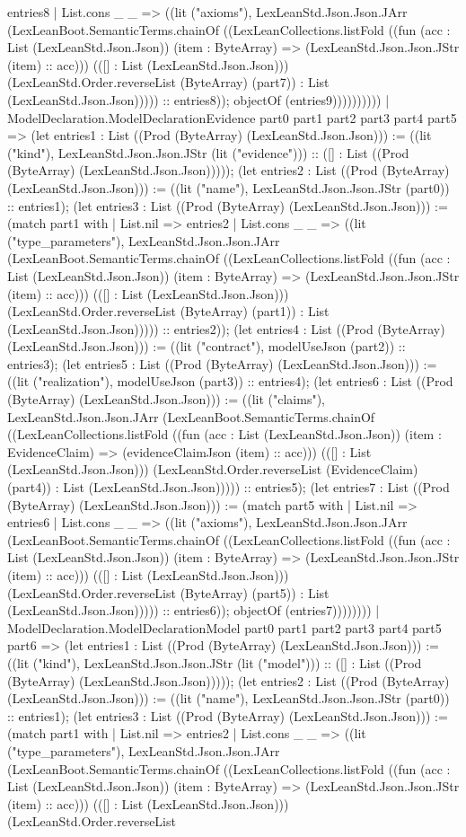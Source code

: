 \documentclass[11pt]{article}
\begin{document}
entries8 | List.cons \_ \_ => ((lit ("axioms"), LexLeanStd.Json.Json.JArr (LexLeanBoot.SemanticTerms.chainOf ((LexLeanCollections.listFold ((fun (acc : List (LexLeanStd.Json.Json)) (item : ByteArray) => (LexLeanStd.Json.Json.JStr (item) :: acc))) (([] : List (LexLeanStd.Json.Json))) (LexLeanStd.Order.reverseList (ByteArray) (part7)) : List (LexLeanStd.Json.Json))))) :: entries8)); objectOf (entries9)))))))))) | ModelDeclaration.ModelDeclarationEvidence part0 part1 part2 part3 part4 part5 => (let entries1 : List ((Prod (ByteArray) (LexLeanStd.Json.Json))) := ((lit ("kind"), LexLeanStd.Json.Json.JStr (lit ("evidence"))) :: ([] : List ((Prod (ByteArray) (LexLeanStd.Json.Json))))); (let entries2 : List ((Prod (ByteArray) (LexLeanStd.Json.Json))) := ((lit ("name"), LexLeanStd.Json.Json.JStr (part0)) :: entries1); (let entries3 : List ((Prod (ByteArray) (LexLeanStd.Json.Json))) := (match part1 with | List.nil => entries2 | List.cons \_ \_ => ((lit ("type\_parameters"), LexLeanStd.Json.Json.JArr (LexLeanBoot.SemanticTerms.chainOf ((LexLeanCollections.listFold ((fun (acc : List (LexLeanStd.Json.Json)) (item : ByteArray) => (LexLeanStd.Json.Json.JStr (item) :: acc))) (([] : List (LexLeanStd.Json.Json))) (LexLeanStd.Order.reverseList (ByteArray) (part1)) : List (LexLeanStd.Json.Json))))) :: entries2)); (let entries4 : List ((Prod (ByteArray) (LexLeanStd.Json.Json))) := ((lit ("contract"), modelUseJson (part2)) :: entries3); (let entries5 : List ((Prod (ByteArray) (LexLeanStd.Json.Json))) := ((lit ("realization"), modelUseJson (part3)) :: entries4); (let entries6 : List ((Prod (ByteArray) (LexLeanStd.Json.Json))) := ((lit ("claims"), LexLeanStd.Json.Json.JArr (LexLeanBoot.SemanticTerms.chainOf ((LexLeanCollections.listFold ((fun (acc : List (LexLeanStd.Json.Json)) (item : EvidenceClaim) => (evidenceClaimJson (item) :: acc))) (([] : List (LexLeanStd.Json.Json))) (LexLeanStd.Order.reverseList (EvidenceClaim) (part4)) : List (LexLeanStd.Json.Json))))) :: entries5); (let entries7 : List ((Prod (ByteArray) (LexLeanStd.Json.Json))) := (match part5 with | List.nil => entries6 | List.cons \_ \_ => ((lit ("axioms"), LexLeanStd.Json.Json.JArr (LexLeanBoot.SemanticTerms.chainOf ((LexLeanCollections.listFold ((fun (acc : List (LexLeanStd.Json.Json)) (item : ByteArray) => (LexLeanStd.Json.Json.JStr (item) :: acc))) (([] : List (LexLeanStd.Json.Json))) (LexLeanStd.Order.reverseList (ByteArray) (part5)) : List (LexLeanStd.Json.Json))))) :: entries6)); objectOf (entries7)))))))) | ModelDeclaration.ModelDeclarationModel part0 part1 part2 part3 part4 part5 part6 => (let entries1 : List ((Prod (ByteArray) (LexLeanStd.Json.Json))) := ((lit ("kind"), LexLeanStd.Json.Json.JStr (lit ("model"))) :: ([] : List ((Prod (ByteArray) (LexLeanStd.Json.Json))))); (let entries2 : List ((Prod (ByteArray) (LexLeanStd.Json.Json))) := ((lit ("name"), LexLeanStd.Json.Json.JStr (part0)) :: entries1); (let entries3 : List ((Prod (ByteArray) (LexLeanStd.Json.Json))) := (match part1 with | List.nil => entries2 | List.cons \_ \_ => ((lit ("type\_parameters"), LexLeanStd.Json.Json.JArr (LexLeanBoot.SemanticTerms.chainOf ((LexLeanCollections.listFold ((fun (acc : List (LexLeanStd.Json.Json)) (item : ByteArray) => (LexLeanStd.Json.Json.JStr (item) :: acc))) (([] : List (LexLeanStd.Json.Json))) (LexLeanStd.Order.reverseList 
\end{document}
